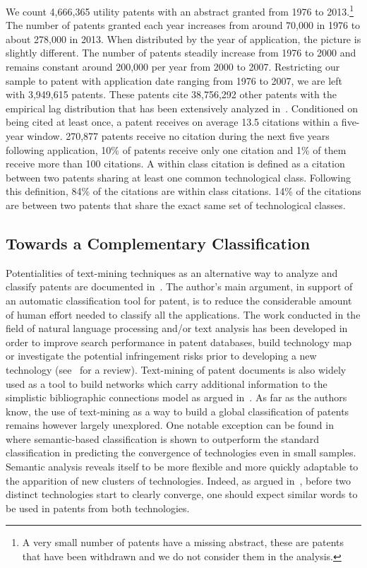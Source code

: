 \documentclass[10pt,A4,draft]{article}
\begin{document}
We count 4,666,365 utility patents with an abstract granted from 1976 to 2013.\footnote{A very small number of patents have a missing abstract, these are patents that have been withdrawn and we do not consider them in the analysis.} The number of patents granted each year increases from around 70,000 in 1976 to about 278,000 in 2013. When distributed by the year of application, the picture is slightly different. The number of patents steadily increase from 1976 to 2000 and remains constant around 200,000 per year from 2000 to 2007. Restricting our sample to patent with application date ranging from 1976 to 2007, we are left with 3,949,615 patents. These patents cite 38,756,292 other patents with the empirical lag distribution that has been extensively analyzed in~\cite{Hall2001}. Conditioned on being cited at least once, a patent receives on average 13.5 citations within a five-year window. 270,877 patents receive no citation during the next five years following application, 10\% of patents receive only one citation and 1\% of them receive more than 100 citations. A within class citation is defined as a citation between two patents sharing at least one common technological class. Following this definition, 84\% of the citations are within class citations. 14\% of the citations are between two patents that share the exact same set of technological classes.


\subsection{Towards a Complementary Classification}

Potentialities of text-mining techniques as an alternative way to analyze and classify patents are documented in~\cite{tseng2007text}. The author's main argument, in support of an automatic classification tool for patent, is to reduce the considerable amount of human effort needed to classify all the applications. The work conducted in the field of natural language processing and/or text analysis has been developed in order to improve search performance in patent databases, build technology map or investigate the potential infringement risks prior to developing a new technology (see~\cite{abbas2014literature} for a review). Text-mining of patent documents is also widely used as a tool to build networks which carry additional information to the simplistic bibliographic connections model as argued in~\cite{yoon2004text}. As far as the authors know, the use of text-mining as a way to build a global classification of patents remains however largely unexplored. One notable exception can be found in~\cite{preschitschek2013} where semantic-based classification is shown to outperform the standard classification in predicting the convergence of technologies even in small samples. Semantic analysis reveals itself to be more flexible and more quickly adaptable to the apparition of new clusters of technologies. Indeed, as argued in~\cite{preschitschek2013}, before two distinct technologies start to clearly converge, one should expect similar words to be used in patents from both technologies.
\end{document}
